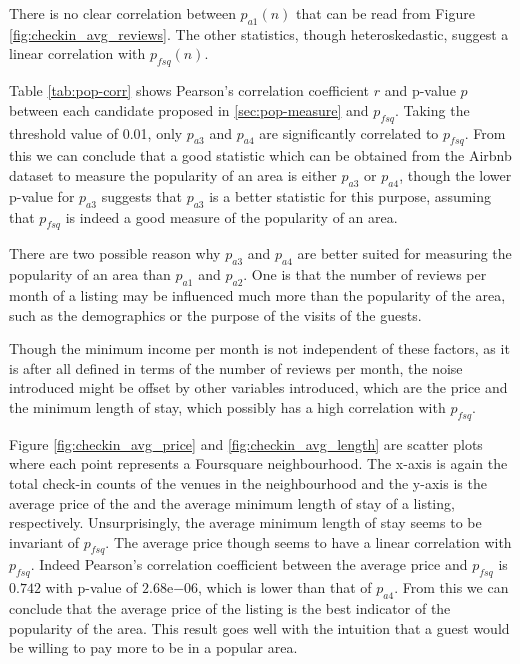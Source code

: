 There is no clear correlation between $p_{a1}(n)$ that can be read from Figure \ref{fig:checkin_avg_reviews}. The other statistics, though heteroskedastic, suggest a linear correlation with $p_{fsq}(n)$.

Table \ref{tab:pop-corr} shows Pearson's correlation coefficient $r$ and p-value $p$ between each candidate proposed in \ref{sec:pop-measure} and $p_{fsq}$.
Taking the threshold value of 0.01, only $p_{a3}$ and $p_{a4}$ are significantly correlated to $p_{fsq}$. From this we can conclude that a good statistic which can be obtained from the Airbnb dataset to measure the popularity of an area is either $p_{a3}$ or $p_{a4}$, though the lower p-value for $p_{a3}$ suggests that $p_{a3}$ is a better statistic for this purpose, assuming that $p_{fsq}$ is indeed a good measure of the popularity of an area.

There are two possible reason why $p_{a3}$ and $p_{a4}$ are better suited for measuring the popularity of an area than $p_{a1}$ and $p_{a2}$. One is that the number of reviews per month of a listing may be influenced much more than the popularity of the area, such as the demographics or the purpose of the visits of the guests.

Though the minimum income per month is not independent of these factors, as it is after all defined in terms of the number of reviews per month, the noise introduced might be offset by other variables introduced, which are the price and the minimum length of stay, which possibly has a high correlation with $p_{fsq}$.

Figure \ref{fig:checkin_avg_price} and \ref{fig:checkin_avg_length} are scatter plots where each point represents a Foursquare neighbourhood. The x-axis is again the total check-in counts of the venues in the neighbourhood and the y-axis is the average price of the and the average minimum length of stay of a listing, respectively. Unsurprisingly, the average minimum length of stay seems to be invariant of $p_{fsq}$. The average price though seems to have a linear correlation with $p_{fsq}$.  Indeed Pearson's correlation coefficient between the average price and $p_{fsq}$ is $0.742$ with p-value of $ 2.68\mathrm{e}{-06}$, which is lower than that of $p_{a4}$. 
From this we can conclude that the average price of the listing is the best indicator of the popularity of the area. This result goes well with the intuition that a guest would be willing to pay more to be in a popular area.

